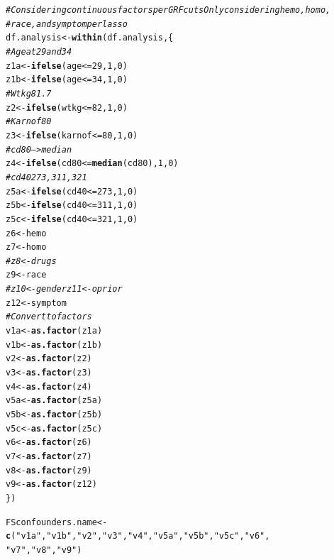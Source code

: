 \documentclass[9pt]{article}\usepackage[]{graphicx}\usepackage[]{xcolor}
\makeatletter
\newcommand{\hlnum}[1]{\textcolor[rgb]{0.686,0.059,0.569}{#1}}%
\newcommand{\hlstr}[1]{\textcolor[rgb]{0.192,0.494,0.8}{#1}}%
\newcommand{\hlcom}[1]{\textcolor[rgb]{0.678,0.584,0.686}{\textit{#1}}}%
\newcommand{\hlopt}[1]{\textcolor[rgb]{0,0,0}{#1}}%
\newcommand{\hlstd}[1]{\textcolor[rgb]{0.345,0.345,0.345}{#1}}%
\newcommand{\hlkwb}[1]{\textcolor[rgb]{0.69,0.353,0.396}{#1}}%
\newcommand{\hlkwd}[1]{\textcolor[rgb]{0.737,0.353,0.396}{\textbf{#1}}}%
\newenvironment{kframe}{%
 \def\at@end@of@kframe{}%
 \ifinner\ifhmode%
  \def\at@end@of@kframe{\end{minipage}}%
  \begin{minipage}{\columnwidth}%
 \fi\fi%
 \def\FrameCommand##1{\hskip\@totalleftmargin \hskip-\fboxsep
 \colorbox{shadecolor}{##1}\hskip-\fboxsep
     \hskip-\linewidth \hskip-\@totalleftmargin \hskip\columnwidth}%
 \MakeFramed {\advance\hsize-\width
   \@totalleftmargin\z@ \linewidth\hsize
   \@setminipage}}%
 {\par\unskip\endMakeFramed%
 \at@end@of@kframe}
\newenvironment{knitrout}{}{} %
\theoremstyle{definition}
\theoremstyle{remark}
\makeatother
\begin{document}
\begin{knitrout}
\begin{kframe}
\begin{alltt}
\hlcom{# Considering continuous factors per GRF cuts Only considering hemo, homo,}
\hlcom{# race, and symptom per lasso}
\hlstd{df.analysis} \hlkwb{<-} \hlkwd{within}\hlstd{(df.analysis, \{}
    \hlcom{# Age at 29 and 34}
    \hlstd{z1a} \hlkwb{<-} \hlkwd{ifelse}\hlstd{(age} \hlopt{<=} \hlnum{29}\hlstd{,} \hlnum{1}\hlstd{,} \hlnum{0}\hlstd{)}
    \hlstd{z1b} \hlkwb{<-} \hlkwd{ifelse}\hlstd{(age} \hlopt{<=} \hlnum{34}\hlstd{,} \hlnum{1}\hlstd{,} \hlnum{0}\hlstd{)}
    \hlcom{# Wtkg 81.7}
    \hlstd{z2} \hlkwb{<-} \hlkwd{ifelse}\hlstd{(wtkg} \hlopt{<=} \hlnum{82}\hlstd{,} \hlnum{1}\hlstd{,} \hlnum{0}\hlstd{)}
    \hlcom{# Karnof 80}
    \hlstd{z3} \hlkwb{<-} \hlkwd{ifelse}\hlstd{(karnof} \hlopt{<=} \hlnum{80}\hlstd{,} \hlnum{1}\hlstd{,} \hlnum{0}\hlstd{)}
    \hlcom{# cd80 ---> median}
    \hlstd{z4} \hlkwb{<-} \hlkwd{ifelse}\hlstd{(cd80} \hlopt{<=} \hlkwd{median}\hlstd{(cd80),} \hlnum{1}\hlstd{,} \hlnum{0}\hlstd{)}
    \hlcom{# cd40 273, 311, 321}
    \hlstd{z5a} \hlkwb{<-} \hlkwd{ifelse}\hlstd{(cd40} \hlopt{<=} \hlnum{273}\hlstd{,} \hlnum{1}\hlstd{,} \hlnum{0}\hlstd{)}
    \hlstd{z5b} \hlkwb{<-} \hlkwd{ifelse}\hlstd{(cd40} \hlopt{<=} \hlnum{311}\hlstd{,} \hlnum{1}\hlstd{,} \hlnum{0}\hlstd{)}
    \hlstd{z5c} \hlkwb{<-} \hlkwd{ifelse}\hlstd{(cd40} \hlopt{<=} \hlnum{321}\hlstd{,} \hlnum{1}\hlstd{,} \hlnum{0}\hlstd{)}
    \hlstd{z6} \hlkwb{<-} \hlstd{hemo}
    \hlstd{z7} \hlkwb{<-} \hlstd{homo}
    \hlcom{# z8<-drugs}
    \hlstd{z9} \hlkwb{<-} \hlstd{race}
    \hlcom{# z10<-gender z11<-oprior}
    \hlstd{z12} \hlkwb{<-} \hlstd{symptom}
    \hlcom{# Convert to factors}
    \hlstd{v1a} \hlkwb{<-} \hlkwd{as.factor}\hlstd{(z1a)}
    \hlstd{v1b} \hlkwb{<-} \hlkwd{as.factor}\hlstd{(z1b)}
    \hlstd{v2} \hlkwb{<-} \hlkwd{as.factor}\hlstd{(z2)}
    \hlstd{v3} \hlkwb{<-} \hlkwd{as.factor}\hlstd{(z3)}
    \hlstd{v4} \hlkwb{<-} \hlkwd{as.factor}\hlstd{(z4)}
    \hlstd{v5a} \hlkwb{<-} \hlkwd{as.factor}\hlstd{(z5a)}
    \hlstd{v5b} \hlkwb{<-} \hlkwd{as.factor}\hlstd{(z5b)}
    \hlstd{v5c} \hlkwb{<-} \hlkwd{as.factor}\hlstd{(z5c)}
    \hlstd{v6} \hlkwb{<-} \hlkwd{as.factor}\hlstd{(z6)}
    \hlstd{v7} \hlkwb{<-} \hlkwd{as.factor}\hlstd{(z7)}
    \hlstd{v8} \hlkwb{<-} \hlkwd{as.factor}\hlstd{(z9)}
    \hlstd{v9} \hlkwb{<-} \hlkwd{as.factor}\hlstd{(z12)}
\hlstd{\})}

\hlstd{FSconfounders.name} \hlkwb{<-} \hlkwd{c}\hlstd{(}\hlstr{"v1a"}\hlstd{,} \hlstr{"v1b"}\hlstd{,} \hlstr{"v2"}\hlstd{,} \hlstr{"v3"}\hlstd{,} \hlstr{"v4"}\hlstd{,} \hlstr{"v5a"}\hlstd{,} \hlstr{"v5b"}\hlstd{,} \hlstr{"v5c"}\hlstd{,} \hlstr{"v6"}\hlstd{,}
    \hlstr{"v7"}\hlstd{,} \hlstr{"v8"}\hlstd{,} \hlstr{"v9"}\hlstd{)}


\end{alltt}
\end{kframe}
\end{knitrout}
\end{document}
